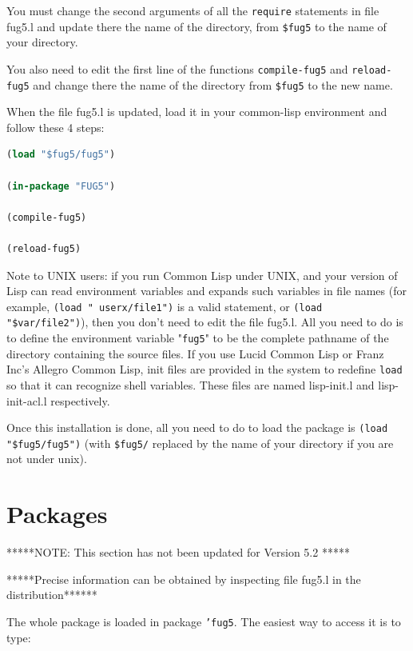 \documentclass[10pt,a4paper]{report}
\begin{document}
\begin{appendices}
You must change the second arguments of all the {\tt require}
statements in file fug5.l and update there the name of the
directory, from {\tt \$fug5} to the name of your directory.

You also need to edit the first line of the functions {\tt compile-fug5}
and {\tt reload-fug5} and change there the name of the directory from
{\tt \$fug5} to the new name. 

When the file fug5.l is updated, load it in your common-lisp
environment and follow these 4 steps:

\begin{lstlisting}[language=Lisp]
(load "$fug5/fug5")

(in-package "FUG5")

(compile-fug5)

(reload-fug5)
\end{lstlisting}


Note to UNIX users: if you run Common Lisp under UNIX, and your
version of Lisp can read environment variables and expands such
variables in file names (for example, {\tt (load "~userx/file1")} is a
valid statement, or {\tt (load "\$var/file2")}), then you don't need to
edit the file fug5.l.  All you need to do is to define the
environment variable "{\tt fug5}" to be the complete pathname of the
directory containing the source files.  If you use Lucid Common Lisp or
Franz Inc's Allegro Common Lisp, init files are provided in the system to
redefine {\tt load} so that it can recognize shell variables.  These files
are named lisp-init.l and lisp-init-acl.l respectively.

Once this installation is done, all you need to do to load the
package is {\tt (load "\$fug5/fug5")} (with {\tt \$fug5/} replaced by the name of
your directory if you are not under unix).



\section{Packages}

*****NOTE: This section has not been updated for Version 5.2 *****

*****Precise information can be obtained by inspecting file fug5.l in the
distribution******

The whole package is loaded in package {\tt 'fug5}. The easiest way to access
it is to type: 


\end{appendices}
\end{document}
